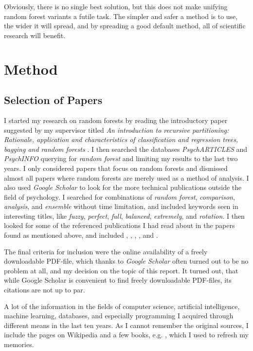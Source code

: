 \documentclass[a4paper,man,12pt,apacite,floatsintext,draftfirst]{apa6} %
\begin{document}
Obviously, there is no single best solution, but this does not make unifying
random forest variants a futile task.
The simpler and safer a method is to use, the wider it will spread, and by
spreading a good default method, all of scientific research will benefit.

\newpage
\section{Method}
\subsection{Selection of Papers}
I started my research on random forests by reading the
introductory paper suggested by my supervisor titled
\emph{An introduction to recursive partitioning: Rationale, application
and characteristics of classification and regression trees, bagging and
random forests} \cite{strobl2009introduction}.
I then searched the databases \emph{PsychARTICLES} and
\emph{PsychINFO} querying for \emph{random forest} and limiting my results
to the last two years.
I only considered papers that focus on random forests and
dismissed almost all papers where random forests are merely used as a
method of analysis.
I also used \emph{Google Scholar} to look for the more technical
publications outside the field of psychology.
I searched for combinations of \emph{random forest}, \emph{comparison},
\emph{analysis}, and \emph{ensemble} without time limitation, and
included keywords seen in interesting titles, like \emph{fuzzy},
\emph{perfect}, \emph{full}, \emph{balanced}, \emph{extremely}, and
\emph{rotation}.
I then looked for some of the referenced publications I had read about in the
papers found as mentioned above, and included ,
, , ,
and .

The final criteria for inclusion were the online availability of a freely
downloadable PDF-file, which thanks to \emph{Google Scholar} often turned
out to be no problem at all, and my decision on the topic of
this report.
It turned out, that while Google Scholar is convenient to find freely
downloadable PDF-files, its citations are not up to par.

A lot of the information in the fields of computer science, artificial
intelligence, machine learning, databases, and especially programming
I acquired through different means in the last ten years.
As I cannot remember the original sources, I include the pages
on Wikipedia and a few books, e.g. ,
which I used to refresh my memories.
\end{document}
